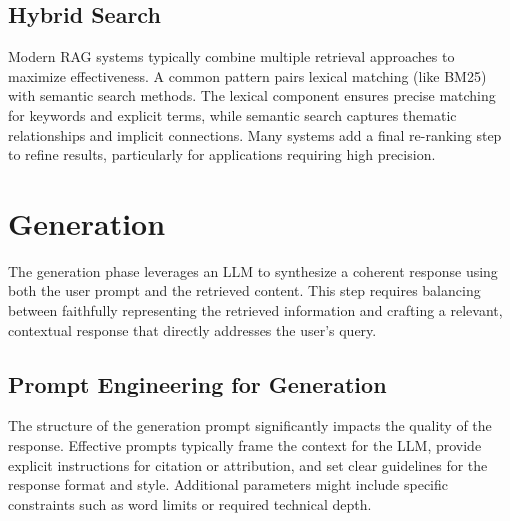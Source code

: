 \documentclass[notoc, tikz]{tufte-handout}
\begin{document}
\subsection{Hybrid Search}

Modern RAG systems typically combine multiple retrieval approaches to maximize effectiveness. 
A common pattern pairs lexical matching (like BM25) with semantic search methods. The lexical component ensures precise matching for keywords and explicit terms, while semantic search captures thematic relationships and implicit connections. Many systems add a final re-ranking step to refine results, particularly for applications requiring high precision.


\section{Generation}\label{generation}

The generation phase leverages an LLM to synthesize a coherent response using both the user prompt and the retrieved content. This step requires balancing between faithfully representing the retrieved information and crafting a relevant, contextual response that directly addresses the user's query.

\subsection{Prompt Engineering for Generation}

The structure of the generation prompt significantly impacts the quality of the response. Effective prompts typically frame the context for the LLM, provide explicit instructions for citation or attribution, and set clear guidelines for the response format and style. Additional parameters might include specific constraints such as word limits or required technical depth.
\end{document}
